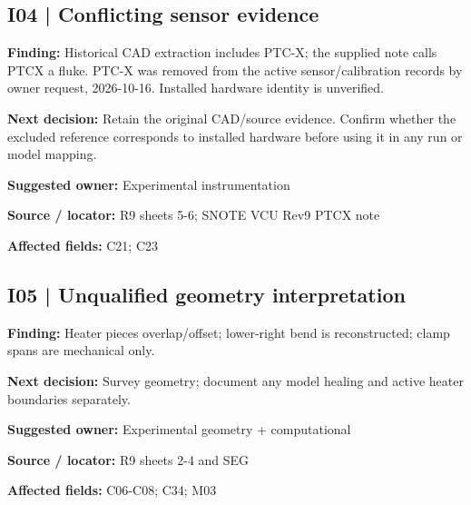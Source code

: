 \documentclass[11pt]{article}
\begin{document}
\par\noindent\begin{minipage}{\textwidth}\small\setlength{\parskip}{2pt}
\subsection*{I04 | Conflicting sensor evidence}
\textbf{Finding:} Historical CAD extraction includes PTC-X; the supplied note calls PTCX a fluke. PTC-X was removed from the active sensor/calibration records by owner request, 2026-10-16. Installed hardware identity is unverified.\par
\textbf{Next decision:} Retain the original CAD/source evidence. Confirm whether the excluded reference corresponds to installed hardware before using it in any run or model mapping.\par
\textbf{Suggested owner:} Experimental instrumentation\par
\textbf{Source / locator:} R9 sheets 5-6; SNOTE VCU Rev9 PTCX note\par
\textbf{Affected fields:} C21; C23\par
\end{minipage}\par\vspace{8pt}
\par\noindent\begin{minipage}{\textwidth}\small\setlength{\parskip}{2pt}
\subsection*{I05 | Unqualified geometry interpretation}
\textbf{Finding:} Heater pieces overlap/offset; lower-right bend is reconstructed; clamp spans are mechanical only.\par
\textbf{Next decision:} Survey geometry; document any model healing and active heater boundaries separately.\par
\textbf{Suggested owner:} Experimental geometry + computational\par
\textbf{Source / locator:} R9 sheets 2-4 and SEG\par
\textbf{Affected fields:} C06-C08; C34; M03\par
\end{minipage}\par\vspace{8pt}
\end{document}
